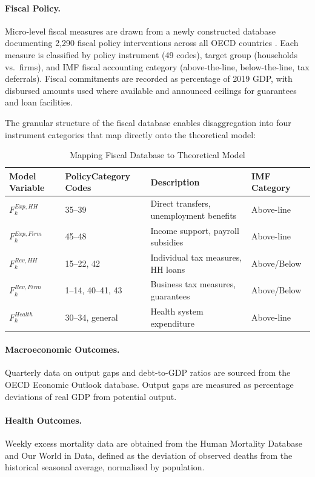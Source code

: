\documentclass[12pt, a4paper]{article}
\begin{document}
\paragraph{Fiscal Policy.} Micro-level fiscal measures are drawn from a newly constructed database documenting 2,290 fiscal policy interventions across all OECD countries \citep{pesenti2025codebook}. Each measure is classified by policy instrument (49 codes), target group (households vs.\ firms), and IMF fiscal accounting category (above-the-line, below-the-line, tax deferrals). Fiscal commitments are recorded as percentage of 2019 GDP, with disbursed amounts used where available and announced ceilings for guarantees and loan facilities.

The granular structure of the fiscal database enables disaggregation into four instrument categories that map directly onto the theoretical model:

\begin{table}[htbp]
\centering
\caption{Mapping Fiscal Database to Theoretical Model}
\label{tab:fiscal_mapping}
\begin{tabular}{llll}
\toprule
Model Variable & PolicyCategory Codes & Description & IMF Category \\
\midrule
$F^{Exp,HH}_k$ & 35--39 & Direct transfers, unemployment benefits & Above-line \\
$F^{Exp,Firm}_k$ & 45--48 & Income support, payroll subsidies & Above-line \\
$F^{Rev,HH}_k$ & 15--22, 42 & Individual tax measures, HH loans & Above/Below \\
$F^{Rev,Firm}_k$ & 1--14, 40--41, 43 & Business tax measures, guarantees & Above/Below \\
$F^{Health}_k$ & 30--34, general & Health system expenditure & Above-line \\
\bottomrule
\end{tabular}
\end{table}

\paragraph{Macroeconomic Outcomes.} Quarterly data on output gaps and debt-to-GDP ratios are sourced from the OECD Economic Outlook database. Output gaps are measured as percentage deviations of real GDP from potential output.

\paragraph{Health Outcomes.} Weekly excess mortality data are obtained from the Human Mortality Database and Our World in Data, defined as the deviation of observed deaths from the historical seasonal average, normalised by population.
\end{document}
